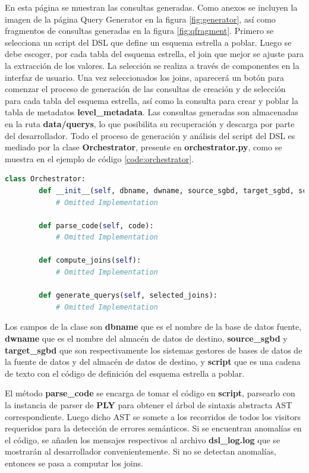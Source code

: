 En esta página se muestran las consultas generadas. Como anexos se incluyen la imagen de la página 
Query Generator en la figura \ref{fig:generator}, así como fragmentos de consultas generadas en 
la figura \ref{fig:qfragment}.
Primero se selecciona un script del DSL que 
define un esquema estrella a poblar. Luego se debe escoger, por cada tabla del esquema estrella, el 
join que mejor se ajuste para la extracción de los valores. La selección se realiza a través 
de componentes en la interfaz de usuario. Una vez seleccionados los joins, aparecer\'a un bot\'on 
para comenzar el proceso de generación de las consultas  
de creación y de selección para cada tabla del esquema estrella, as\'i como la consulta 
para crear y poblar la tabla de metadatos \textbf{level\_metadata}. Las consultas generadas 
son almacenadas en la ruta \textbf{data/querys}, lo que posibilita su recuperación y descarga por parte del desarrollador. 
Todo el proceso de generación y análisis del script del DSL es mediado por la clase \textbf{Orchestrator}, 
presente en \textbf{orchestrator.py}, como se muestra en el ejemplo de c\'odigo \ref{code:orchestrator}.

\begin{lstlisting}[label={code:orchestrator}, caption={Clase Orchestrator}, language={python}]
    class Orchestrator:
        def __init__(self, dbname, dwname, source_sgbd, target_sgbd, script) -> None:
            # Omitted Implementation

        def parse_code(self, code):
            # Omitted Implementation

        def compute_joins(self):
            # Omitted Implementation

        def generate_querys(self, selected_joins):
            # Omitted Implementation
\end{lstlisting}

Los campos de la clase son \textbf{dbname} que es el nombre de la base de datos fuente, 
\textbf{dwname} que es el nombre del almacén de datos de destino, \textbf{source\_sgbd} y 
\textbf{target\_sgbd} que son respectivamente los sistemas gestores de bases de datos de la fuente de datos y 
del almacén de datos de destino, y \textbf{script} que es una cadena de texto con el código 
de definición del esquema estrella a poblar.

El método \textbf{parse\_code} se encarga de tomar el código en \textbf{script}, parsearlo 
con la instancia de parser de \textbf{PLY} para obtener el árbol de sintaxis abstracta AST correspondiente. 
Luego dicho AST se somete a los recorridos de todos los visitors requeridos para la detección de errores semánticos. Si se 
encuentran anomalías en el código, se añaden los mensajes respectivos al archivo \textbf{dsl\_log.log} 
que se mostrarán al desarrollador convenientemente. Si no se detectan anomalías, entonces se pasa a computar los joins. 

